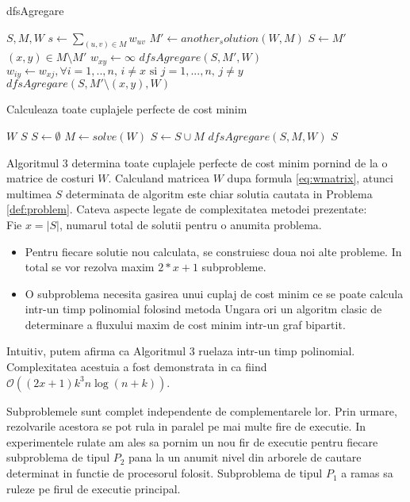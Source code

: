 \begin{algorithm}
\caption{dfsAgregare}
\begin{algorithmic}[1]
\REQUIRE $S, M, W$
  \STATE $s \gets \sum_{(u, v) \in M} w_{uv}$
  \STATE $M' \gets another_solution(W, M)$
    \RETURN
  \ELSE
    \STATE $S \gets M'$
    \STATE $(x, y) \in M \setminus M'$
    \STATE $w_{xy} \gets \infty$
    \STATE $dfsAgregare(S, M', W)$
    \STATE $w_{iy} \gets w_{xj}, \forall i = 1,..,n \text{, }i \neq x  \text{ si } j = 1,...,n \text{, }j \neq y$
    \STATE $dfsAgregare(S, M' \setminus (x, y), W)$
  \ENDIF
\end{algorithmic}
\end{algorithm}

\begin{algorithm}
\caption{Calculeaza toate cuplajele perfecte de cost minim}
\begin{algorithmic}[1]
\REQUIRE $W$
\ENSURE $S$
  \STATE $S \gets \emptyset$
  \STATE $M \gets solve(W)$
  \STATE $S \gets S \cup M$
  \STATE $dfsAgregare(S, M, W)$
  \RETURN $S$
\end{algorithmic}
\end{algorithm}

Algoritmul 3 determina toate cuplajele perfecte de cost minim pornind de la o matrice de costuri
$W$. Calculand matricea $W$ dupa formula \eqref{eq:wmatrix}, atunci multimea $S$ determinata de
algoritm este chiar solutia cautata in Problema \ref{def:problem}. Cateva aspecte legate de
complexitatea metodei prezentate: \\
Fie $x = |S|$, numarul total de solutii pentru o anumita problema.
\begin{itemize}
  \item Pentru fiecare solutie nou calculata, se construiesc doua noi alte probleme. In total se vor
    rezolva maxim $2*x+1$ subprobleme.
  \item O subproblema necesita gasirea unui cuplaj de cost minim ce se poate calcula intr-un timp
    polinomial folosind metoda Ungara\cite{hungarianmethod} ori un algoritm clasic de determinare
    a fluxului maxim de cost minim intr-un graf bipartit\cite{flowassignment}.
\end{itemize}
Intuitiv, putem afirma ca Algoritmul 3 ruelaza intr-un timp polinomial. Complexitatea acestuia a
fost demonstrata in \cite{allmatchings} ca fiind $\mathcal{O}((2x+1)k^3n\log(n+k))$.

Subproblemele sunt complet independente de complementarele lor. Prin urmare, rezolvarile acestora se
pot rula in paralel pe mai multe fire de executie. In experimentele rulate am ales sa pornim
un nou fir de executie pentru fiecare subproblema de tipul $P_2$ pana la un anumit nivel din
arborele de cautare determinat in functie de procesorul folosit. Subproblema de tipul $P_1$
a ramas sa ruleze pe firul de executie principal.


